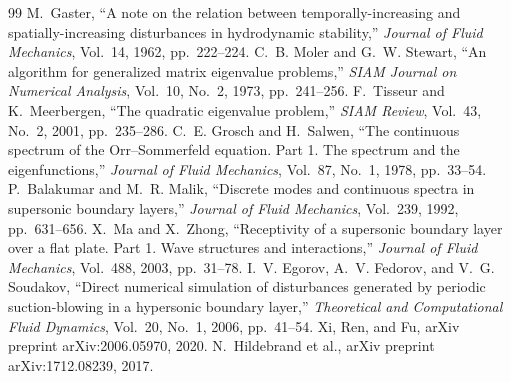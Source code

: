 \documentclass[11pt]{article}
\begin{document}
\begin{thebibliography}{99}
 M.~Gaster, ``A note on the relation between temporally-increasing and
  spatially-increasing disturbances in hydrodynamic stability,'' \emph{Journal of Fluid
  Mechanics}, Vol.~14, 1962, pp.~222--224.
 C.~B. Moler and G.~W. Stewart, ``An algorithm for generalized matrix
  eigenvalue problems,'' \emph{SIAM Journal on Numerical Analysis}, Vol.~10, No.~2, 1973,
  pp.~241--256.
 F.~Tisseur and K.~Meerbergen, ``The quadratic eigenvalue problem,''
  \emph{SIAM Review}, Vol.~43, No.~2, 2001, pp.~235--286.
 C.~E. Grosch and H.~Salwen, ``The continuous spectrum of the Orr--Sommerfeld
  equation. Part 1. The spectrum and the eigenfunctions,'' \emph{Journal of Fluid Mechanics},
  Vol.~87, No.~1, 1978, pp.~33--54.
 P.~Balakumar and M.~R. Malik, ``Discrete modes and continuous spectra in
  supersonic boundary layers,'' \emph{Journal of Fluid Mechanics}, Vol.~239, 1992, pp.~631--656.
 X.~Ma and X.~Zhong, ``Receptivity of a supersonic boundary layer over a flat
  plate. Part 1. Wave structures and interactions,'' \emph{Journal of Fluid Mechanics}, Vol.~488,
  2003, pp.~31--78.
 I.~V. Egorov, A.~V. Fedorov, and V.~G. Soudakov, ``Direct numerical
  simulation of disturbances generated by periodic suction-blowing in a hypersonic boundary
  layer,'' \emph{Theoretical and Computational Fluid Dynamics}, Vol.~20, No.~1, 2006, pp.~41--54.
 Xi, Ren, and Fu, arXiv preprint arXiv:2006.05970, 2020.
 N.~Hildebrand et al., arXiv preprint arXiv:1712.08239, 2017.
\end{thebibliography}
\end{document}
